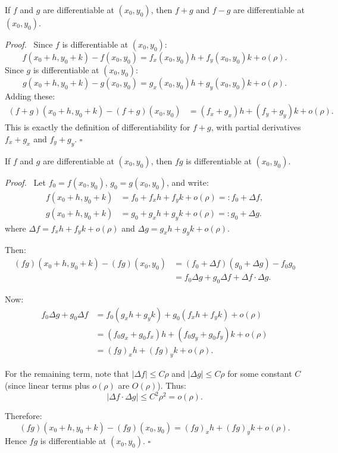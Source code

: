 \documentclass[11pt]{report}
\renewenvironment{proof}[1][Proof]{\par\noindent\textit{#1.}\ }{\hfill$\square$\par\medskip}
\begin{document}
\begin{theorem}
If $f$ and $g$ are differentiable at $(x_0, y_0)$, then $f + g$ and $f - g$ are differentiable at $(x_0, y_0)$.
\end{theorem}

\begin{proof}
Since $f$ is differentiable at $(x_0, y_0)$:
\[
f(x_0 + h, y_0 + k) - f(x_0, y_0) = f_x(x_0, y_0) h + f_y(x_0, y_0) k + o(\rho).
\]
Since $g$ is differentiable at $(x_0, y_0)$:
\[
g(x_0 + h, y_0 + k) - g(x_0, y_0) = g_x(x_0, y_0) h + g_y(x_0, y_0) k + o(\rho).
\]
Adding these:
\begin{align*}
(f + g)(x_0 + h, y_0 + k) - (f + g)(x_0, y_0) &= (f_x + g_x) h + (f_y + g_y) k + o(\rho).
\end{align*}
This is exactly the definition of differentiability for $f + g$, with partial derivatives $f_x + g_x$ and $f_y + g_y$.
\end{proof}

\begin{theorem}
If $f$ and $g$ are differentiable at $(x_0, y_0)$, then $fg$ is differentiable at $(x_0, y_0)$.
\end{theorem}

\begin{proof}
Let $f_0 = f(x_0, y_0)$, $g_0 = g(x_0, y_0)$, and write:
\begin{align*}
f(x_0 + h, y_0 + k) &= f_0 + f_x h + f_y k + o(\rho) =: f_0 + \Delta f, \\
g(x_0 + h, y_0 + k) &= g_0 + g_x h + g_y k + o(\rho) =: g_0 + \Delta g.
\end{align*}
where $\Delta f = f_x h + f_y k + o(\rho)$ and $\Delta g = g_x h + g_y k + o(\rho)$.

Then:
\begin{align*}
(fg)(x_0 + h, y_0 + k) - (fg)(x_0, y_0) &= (f_0 + \Delta f)(g_0 + \Delta g) - f_0 g_0 \\
&= f_0 \Delta g + g_0 \Delta f + \Delta f \cdot \Delta g.
\end{align*}

Now:
\begin{align*}
f_0 \Delta g + g_0 \Delta f &= f_0 (g_x h + g_y k) + g_0 (f_x h + f_y k) + o(\rho) \\
&= (f_0 g_x + g_0 f_x) h + (f_0 g_y + g_0 f_y) k + o(\rho) \\
&= (fg)_x h + (fg)_y k + o(\rho).
\end{align*}

For the remaining term, note that $|\Delta f| \leq C\rho$ and $|\Delta g| \leq C\rho$ for some constant $C$ (since linear terms plus $o(\rho)$ are $O(\rho)$). Thus:
\[
|\Delta f \cdot \Delta g| \leq C^2 \rho^2 = o(\rho).
\]

Therefore:
\[
(fg)(x_0 + h, y_0 + k) - (fg)(x_0, y_0) = (fg)_x h + (fg)_y k + o(\rho).
\]
Hence $fg$ is differentiable at $(x_0, y_0)$.
\end{proof}
\end{document}
